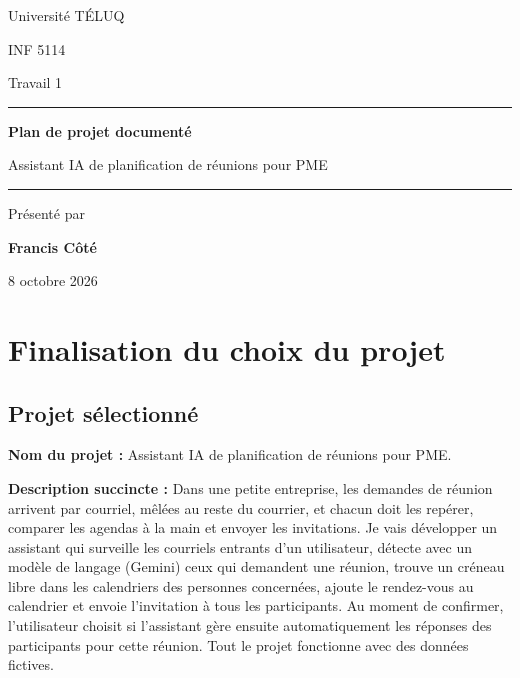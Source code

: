 \documentclass[11pt,letterpaper]{article}
\begin{document}
\begin{titlepage}
  \centering
  {\Large Université TÉLUQ\par}
  \vspace{3.5cm}
  {\large INF 5114\par}
  \vspace{0.4cm}
  {\large Travail 1\par}
  \vspace{2cm}
  \rule{\textwidth}{0.6pt}\par
  \vspace{0.6cm}
  {\LARGE\bfseries Plan de projet documenté\par}
  \vspace{0.5cm}
  {\Large Assistant IA de planification de réunions pour PME\par}
  \vspace{0.6cm}
  \rule{\textwidth}{0.6pt}\par
  \vspace{3cm}
  {\large Présenté par\par}
  \vspace{0.2cm}
  {\large\bfseries Francis Côté\par}
  \vfill
  {\large 8 octobre 2026\par}
\end{titlepage}

\tableofcontents
\newpage
{}

\section{Finalisation du choix du projet}

\subsection{Projet sélectionné}

\textbf{Nom du projet :} Assistant IA de planification de réunions pour PME.

\textbf{Description succincte :} Dans une petite entreprise, les demandes de réunion arrivent par courriel, mêlées au reste du courrier, et chacun doit les repérer, comparer les agendas à la main et envoyer les invitations. Je vais développer un assistant qui surveille les courriels entrants d'un utilisateur, détecte avec un modèle de langage (Gemini) ceux qui demandent une réunion, trouve un créneau libre dans les calendriers des personnes concernées, ajoute le rendez-vous au calendrier et envoie l'invitation à tous les participants. Au moment de confirmer, l'utilisateur choisit si l'assistant gère ensuite automatiquement les réponses des participants pour cette réunion. Tout le projet fonctionne avec des données fictives.
\end{document}
